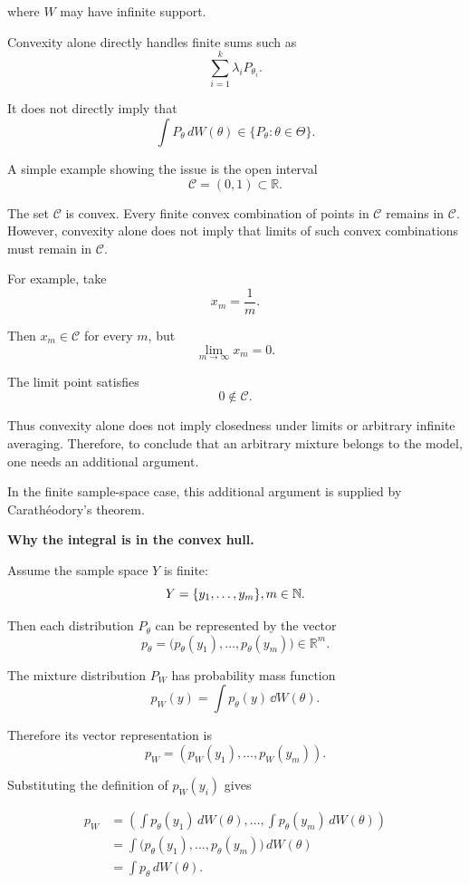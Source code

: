 where $W$ may have infinite support.

Convexity alone directly handles finite sums such as
$$
\sum_{i=1}^k \lambda_i P_{\theta_i}.
$$

It does not directly imply that
$$
\int P_\theta\,dW(\theta)\in\{P_\theta:\theta\in\Theta\}.
$$

A simple example showing the issue is the open interval
$$
\mathcal C=(0,1)\subset\mathbb R.
$$

The set $\mathcal C$ is convex. Every finite convex combination of points in $\mathcal C$ remains in $\mathcal C$. However, convexity alone does not imply that limits of such convex combinations must remain in $\mathcal C$.

For example, take
$$
x_m=\frac{1}{m}.
$$

Then $x_m\in\mathcal C$ for every $m$, but
$$
\lim_{m\to\infty} x_m=0.
$$

The limit point satisfies
$$
0\notin\mathcal C.
$$

Thus convexity alone does not imply closedness under limits or arbitrary infinite averaging. Therefore, to conclude that an arbitrary mixture belongs to the model, one needs an additional argument.

In the finite sample-space case, this additional argument is supplied by Carathéodory's theorem.

\textbf{Why the integral is in the convex hull.}

Assume the sample space $Y$ is finite:
$$
Y=\{y_1,\dots,y_m\}, m \in \mathbb{N}.
$$

Then each distribution $P_\theta$ can be represented by the vector
$$
p_\theta
=
\bigl(p_\theta(y_1),\dots,p_\theta(y_m)\bigr)
\in\mathbb R^m.
$$

The mixture distribution $P_W$ has probability mass function
$$
p_W(y)
=
\int p_\theta(y)\,\dd{W(\theta)}.
$$

Therefore its vector representation is
$$
p_W
=
\left(p_W(y_1),\dots,p_W(y_m)\right).
$$

Substituting the definition of $p_W(y_i)$ gives

\begin{align}
p_W
&=
\left(
\int p_\theta(y_1)\,dW(\theta),
\dots,
\int p_\theta(y_m)\,dW(\theta)
\right) \\
&=
\int
\bigl(p_\theta(y_1),\dots,p_\theta(y_m)\bigr)
\,dW(\theta) \\
&=
\int p_\theta\,dW(\theta).
\end{align}

